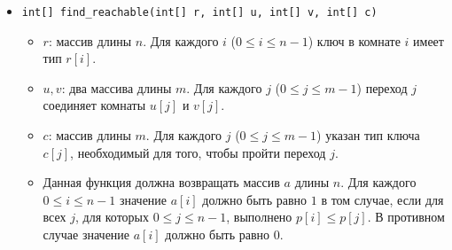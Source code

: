 \begin{itemize}
\item \texttt{int[] find\_reachable(int[] r, int[] u, int[] v, int[] c)}
\begin{itemize}

\item $r$: массив длины $n$. Для каждого $i$ ($0\leq i\leq n-1$) ключ в комнате $i$ имеет тип $r[i]$.
\item $u,v$: два массива длины $m$. Для каждого $j$ ($0\leq j\leq m-1$) переход $j$ соединяет комнаты $u[j]$ и $v[j]$.
\item $c$: массив длины $m$. Для каждого $j$ ($0\leq j\leq m-1$) указан тип ключа $c[j]$, необходимый для того, чтобы пройти переход $j$.
\item Данная функция должна возвращать массив $a$ длины $n$. Для каждого $0 \leq i \leq n-1$ значение $a[i]$ должно быть равно $1$ в том случае, если для всех $j$, для которых $0 \leq j \leq n-1$, выполнено $p[i] \leq p[j]$. В противном случае значение $a[i]$ должно быть равно $0$.
\end{itemize}
\end{itemize}

